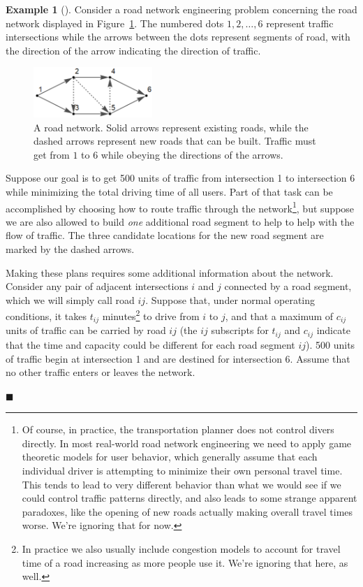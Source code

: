 \documentclass[11pt]{article}
\theoremstyle{definition} %
\newtheorem{ex}{Example}[section] %
\newenvironment{example}[1][]{\begin{ex}[#1]}{\hfill$\blacksquare$\end{ex}} %
\begin{document}
\begin{example}
\label{ex:networkdesign}
	Consider a road network engineering problem concerning the road network displayed in Figure~\ref{fig:networkdesign}. The numbered dots $1,2,\dots,6$ represent traffic intersections while the arrows between the dots represent segments of road, with the direction of the arrow indicating the direction of traffic.
	
	\begin{figure}[h]
		\centering
		\includegraphics[width=0.4\textwidth]{figures/network_design_01.png}
		\caption{A road network. Solid arrows represent existing roads, while the dashed arrows represent new roads that can be built. Traffic must get from $1$ to $6$ while obeying the directions of the arrows.}
		\label{fig:networkdesign}
	\end{figure}
	
	Suppose our goal is to get 500 units of traffic from intersection 1 to intersection 6 while minimizing the total driving time of all users. Part of that task can be accomplished by choosing how to route traffic through the network\footnote{Of course, in practice, the transportation planner does not control divers directly. In most real-world road network engineering we need to apply game theoretic models for user behavior, which generally assume that each individual driver is attempting to minimize their own personal travel time. This tends to lead to very different behavior than what we would see if we could control traffic patterns directly, and also leads to some strange apparent paradoxes, like the opening of new roads actually making overall travel times worse. We're ignoring that for now.}, but suppose we are also allowed to build \textit{one} additional road segment to help to help with the flow of traffic. The three candidate locations for the new road segment are marked by the dashed arrows.
	
	Making these plans requires some additional information about the network. Consider any pair of adjacent intersections $i$ and $j$ connected by a road segment, which we will simply call road $ij$. Suppose that, under normal operating conditions, it takes $t_{ij}$ minutes\footnote{In practice we also usually include congestion models to account for travel time of a road increasing as more people use it. We're ignoring that here, as well.} to drive from $i$ to $j$, and that a maximum of $c_{ij}$ units of traffic can be carried by road $ij$ (the $ij$ subscripts for $t_{ij}$ and $c_{ij}$ indicate that the time and capacity could be different for each road segment $ij$). 500 units of traffic begin at intersection 1 and are destined for intersection 6. Assume that no other traffic enters or leaves the network.
	

\end{example}
\end{document}
